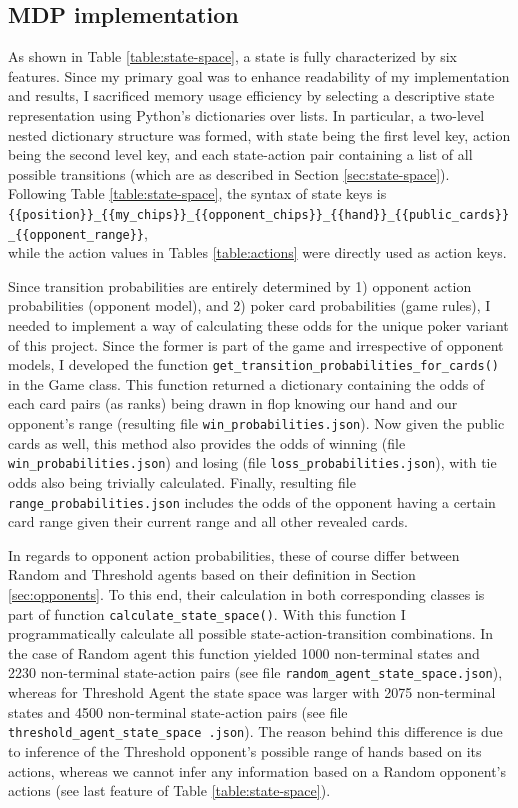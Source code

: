 \subsection{MDP implementation}

As shown in Table \ref{table:state-space}, a state is fully characterized by six features. Since my primary goal was to enhance readability of my implementation and results, I sacrificed memory usage efficiency by selecting a descriptive state representation using Python's dictionaries over lists. In particular, a two-level nested dictionary structure was formed, with state being the first level key, action being the second level key, and each state-action pair containing a list of all possible transitions (which are as described in Section \ref{sec:state-space}). Following Table \ref{table:state-space}, the syntax of state keys is {\small \Verb|{{position}}_{{my_chips}}_{{opponent_chips}}_{{hand}}_{{public_cards}}_{{opponent_range}}|}, \\ while the action values in Tables \ref{table:actions} were directly used as action keys.

Since transition probabilities are entirely determined by 1) opponent action probabilities (opponent model), and 2) poker card probabilities (game rules), I needed to implement a way of calculating these odds for the unique poker variant of this project. Since the former is part of the game and irrespective of opponent models, I developed the function \Verb|get_transition_probabilities_for_cards()| in the Game class. This function returned a dictionary containing the odds of each card pairs (as ranks) being drawn in flop knowing our hand and our opponent's range (resulting file \Verb|win_probabilities.json|). Now given the public cards as well, this method also provides the odds of winning (file \\ \Verb|win_probabilities.json|) and losing (file \Verb|loss_probabilities.json|), with tie odds also being trivially calculated. Finally, resulting file \Verb|range_probabilities.json| includes the odds of the opponent having a certain card range given their current range and all other revealed cards.

In regards to opponent action probabilities, these of course differ between Random and Threshold agents based on their definition in Section \ref{sec:opponents}. To this end, their calculation in both corresponding classes is part of function \Verb|calculate_state_space()|. With this function I programmatically calculate all possible state-action-transition combinations. In the case of Random agent this function yielded 1000 non-terminal states and 2230 non-terminal state-action pairs (see file \Verb|random_agent_state_space.json|), whereas for Threshold Agent the state space was larger with 2075 non-terminal states and 4500 non-terminal state-action pairs (see file \texttt{threshold\_agent\_state\_space .json}). The reason behind this difference is due to inference of the Threshold opponent's possible range of hands based on its actions, whereas we cannot infer any information based on a Random opponent's actions (see last feature of Table \ref{table:state-space}).

